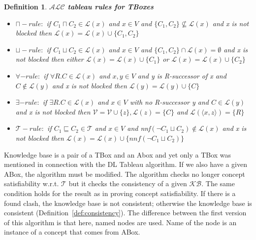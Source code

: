 \documentclass[12pt,a4paper]{article}
\newtheorem{definition}{Definition}[subsection]
\begin{document}
\begin{definition}{\textbf{$\mathcal{ALC}$ tableau rules for TBoxes}}
	\begin{itemize}
		\item $\sqcap-rule:$ if $C_{1} \sqcap C_{2} \in \mathcal{L}(x)$ and $x \in V$ and $\{ C_{1}, C_{2} \} \not \subseteq \mathcal{L}(x)$ and x is not blocked then $\mathcal{L}(x) = \mathcal{L}(x) \cup \{ C_{1}, C_{2} \}$
		
		\item $\sqcup-rule:$ if $C_{1} \sqcup C_{2} \in \mathcal{L}(x)$ and $x \in V$ and $ \{ C_{1}, C_{2} \} \cap \mathcal{L}(x) = \emptyset$ and x is not blocked then either $\mathcal{L}(x) = \mathcal{L}(x) \cup \{ C_{1} \}$ or $\mathcal{L}(x) = \mathcal{L}(x) \cup \{ C_{2} \}$
		
		\item $\forall-rule:$ if $\forall R.C \in \mathcal{L}(x)$ and $x,y \in V$ and y is R-successor of x and $C \not \in \mathcal{L}(y)$ and x is not blocked then $\mathcal{L}(y) = \mathcal{L}(y) \cup \{ C \}$
		
		\item $\exists-rule:$ if $\exists R.C \in \mathcal{L}(x)$ and $x \in V$ with no R-successor y and $C \in \mathcal{L}(y)$ and x is not blocked then $\mathcal{V} = \mathcal{V} \cup \{ z \}, \mathcal{L}(z) = \{ C\}$ and $\mathcal{L}( \langle x, z \rangle ) = \{ R \}$
		
		\item $\mathcal{T}-rule:$ if $C_{1} \sqsubseteq C_{2} \in \mathcal{T}$ and $x \in V$ and nnf$(\neg C_{1} \sqcup C_{2}) \not \in \mathcal{L}(x)$ and x is not blocked then $\mathcal{L}(x) = \mathcal{L}(x) \cup \{ nnf(\neg C_{1} \sqcup C_{2}) \}$
	\end{itemize}
\end{definition}	

Knowledge base is a pair of a TBox and an Abox and yet only a TBox was mentioned in connection with the DL Tableau algorithm. If we also have a given ABox, the algorithm must be modified. The algorithm checks no longer concept satisfiability w.r.t. $\mathcal{T}$ but it checks the consistency of a given $\mathcal{KB}$. The same condition holds for the result as in proving concept satisfiability. If there is a found clash, the knowledge base is not consistent; otherwise the knowledge base is consistent (Definition~\ref{def:consistency}). The difference between the first version of this algorithm is that here, named nodes are used. Name of the node is an instance of a concept that comes from ABox. 
\end{document}
